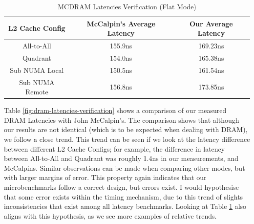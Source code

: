 \documentclass[bsc,frontabs,twoside,singlespacing,parskip,deptreport]{infthesis}     %
\begin{document}
\begin{table}[!h]
\begin{center}
\caption{MCDRAM Latencies Verification (Flat Mode)}
\label{fig:mcdram-latencies-verification}
\begin{tabular}{ |c|c|c| } 
    \hline
    L2 Cache Config  & McCalpin's Average Latency & Our Average Latency \\
    \hline
    All-to-All      & 155.9ns  & 169.23ns \\
    Quadrant        & 154.0ns  & 165.38ns \\
    Sub NUMA Local  & 150.5ns  & 161.54ns \\
    Sub NUMA Remote & 156.8ns  & 173.85ns \\
    \hline
\end{tabular}
\end{center}
\end{table}

Table \ref{fig:dram-latencies-verification} shows a comparison of our measured DRAM Latencies with John McCalpin's. The comparison shows that although our results are not identical (which is to be expected when dealing with DRAM), we follow a close trend. This trend can be seen if we look at the latency difference between different L2 Cache Configs; for example, the difference in latency between All-to-All and Quadrant was roughly 1.4ns in our measurements, and McCalpins. Similar observations can be made when comparing other modes, but with larger margins of error. This property again indicates that our microbenchmarks follow a correct design, but errors exist. I would hypothesise that some error exists within the timing mechanism, due to this trend of slights inconsistencies that exist among all latency benchmarks. Looking at Table \ref{fig:mcdram-latencies-verification} also aligns with this hypothesis, as we see more examples of relative trends.
\end{document}

